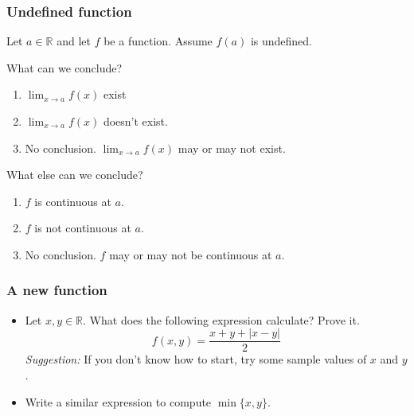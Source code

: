 \documentclass[14pt]{beamer}
\begin{document}
\begin{frame}[t]
	\frametitle{Undefined function}
	\fontsize{13}{13}\selectfont Let $a \in \mathbb{R}$ and let $f$ be a function.
	Assume $f(a)$ is undefined.

	\vfill

	\begin{block}{What can we conclude?}
		\begin{enumerate}
			\item $\displaystyle \lim_{x \to a}f(x)$ exist

			\item $\displaystyle \lim_{x \to a}f(x)$ doesn't exist.

			\item No conclusion. $\displaystyle \lim_{x \to a}f(x)$ may or may not
				exist.
		\end{enumerate}
	\end{block}

	\vfill

	\begin{block}{What else can we conclude?}
		\begin{enumerate}
			\addtocounter{enumi}{3}

			\item $f$ is continuous at $a$.

			\item $f$ is not continuous at $a$.

			\item No conclusion. $f$ may or may not be continuous at $a$.
		\end{enumerate}
	\end{block}

	\vfill
\end{frame}

\begin{frame}
	\frametitle{A new function}

	\begin{itemize}
		\item Let $x, y \in \mathbb{R}$. What does the following expression
			calculate? Prove it.
			\[
				f(x,y) = \frac{x + y + |x - y|}{2}
			\]
			\emph{Suggestion:} If you don't know how to start, try some sample values
			of $x$ and $y$.
			\vfill

		\item Write a similar expression to compute $\displaystyle \min \{ x, y \}$.
	\end{itemize}
	\vfill
\end{frame}
\end{document}
